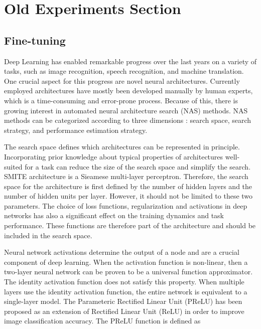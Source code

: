\newpage
\section{Old Experiments Section}


\subsection{Fine-tuning}

Deep Learning has enabled remarkable progress over the last years on a variety of tasks, such as image recognition, speech recognition, and machine translation. One crucial aspect for this progress are novel neural architectures. Currently employed architectures have mostly been developed manually by human experts, which is a time-consuming and error-prone process. Because of this, there is growing interest in automated neural architecture search (NAS) methods. NAS methods can be categorized according to three dimensions \citep{elsken2018neural}: search space, search strategy, and performance estimation strategy.

The search space defines which architectures can be represented
in principle. Incorporating prior knowledge about typical properties of architectures well-suited for a task can reduce the size of the search space and simplify the search. SMITE architecture is a Sieamese multi-layer perceptron. Therefore, the search space for the architecture is first defined by the number of hidden layers and the number of hidden units per layer. However, it should not be limited to these two parameters. The choice of loss functions, regularization and activations in deep networks has also a significant effect on the training dynamics and task performance. These functions are therefore part of the architecture and should be included in the search space.

Neural network activations determine the output of a node and are a crucial component of deep learning. When the activation function is non-linear, then a two-layer neural network can be proven to be a universal function approximator. The identity activation function does not satisfy this property. When multiple layers use the identity activation function, the entire network is equivalent to a single-layer model. The Parameteric Rectified Linear Unit (PReLU) \citep{he2015delving} has been proposed as an extension of Rectified Linear Unit (ReLU) \citep{nair2010rectified} in order to improve image classification accuracy. The PReLU function is defined as

